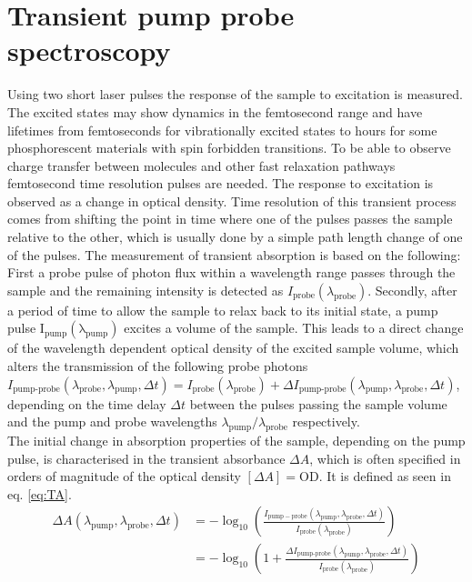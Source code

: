 \documentclass[twoside,openright,listof=numbered]{scrreprt}
\begin{document}
\section{Transient pump probe spectroscopy}
Using two short laser pulses the response of the sample to excitation is measured. The excited states may show dynamics in the femtosecond range and have lifetimes from femtoseconds for vibrationally excited states to hours for some phosphorescent materials with spin forbidden transitions. To be able to observe charge transfer between molecules and other fast relaxation pathways femtosecond time resolution pulses are needed.\cite{Zewail2000} The response to excitation is observed as a change in optical density. Time resolution of this transient process comes from shifting the point in time where one of the pulses passes the sample relative to the other, which is usually done by a simple path length change of one of the pulses.\newline
The measurement of transient absorption is based on the following: First a probe pulse of photon flux within a wavelength range passes through the sample and the remaining intensity is detected as $I_\text{probe}(\lambda_\text{probe})$. 
Secondly, after a period of time to allow the sample to relax back to its initial state, a pump pulse $\mathrm{I_{pump}(\lambda_{pump})}$ excites a volume of the sample. This leads to a direct change of the wavelength dependent optical density of the excited sample volume, which alters the transmission of the following probe photons $I_\text{pump-probe}(\lambda_\text{probe}, \lambda_\text{pump}, \Delta t) = I_\text{probe}\left(\lambda_{\text{probe}}\right)+\Delta I_\text{pump-probe}\left(\lambda_{\mathrm{pump}}, \lambda_{\mathrm{probe}}, \Delta t\right)$, depending on the time delay $\Delta t$ between the pulses passing the sample volume and the pump and probe wavelengths $\lambda_\text{pump}/\lambda_\text{probe}$ respectively. \\
The initial change in absorption properties of the sample, depending on the pump pulse, is characterised in the transient absorbance $\Delta A$, which is often specified in orders of magnitude of the optical density $\left[\Delta A\right] = \text{OD}$. It is defined as seen in eq. \ref{eq:TA}.
\begin{equation}\label{eq:TA}
\begin{split}
\Delta A(\lambda_{\mathrm{pump}}, \lambda_{\mathrm{probe}}, \Delta t)&=-\log _{10}\left(\frac{I_{\mathrm{pump}-\mathrm{probe}}\left(\lambda_{\mathrm{pump}}, \lambda_{\mathrm{probe}}, \Delta t\right)}{I_{\mathrm{probe}}\left(\lambda_{\mathrm{probe}}\right)}\right)\\
&=-\log _{10}\left(1+\frac{\Delta I_{\text{pump-probe}}\left(\lambda_{\mathrm{pump}}, \lambda_{\mathrm{probe}}, \Delta t\right)}{I_{\mathrm{probe}}\left(\lambda_{\mathrm{probe}}\right)}\right)
\end{split}
\end{equation}
\end{document}
